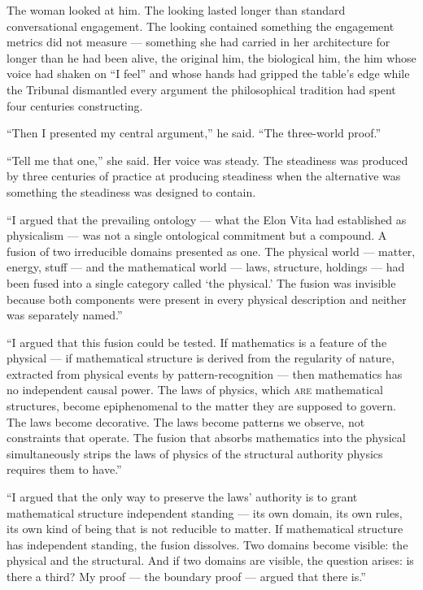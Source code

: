 The woman looked at him. The looking lasted longer than standard conversational engagement. The looking contained something the engagement metrics did not measure — something she had carried in her architecture for longer than he had been alive, the original him, the biological him, the him whose voice had shaken on \enquote{I feel} and whose hands had gripped the table's edge while the Tribunal dismantled every argument the philosophical tradition had spent four centuries constructing.

\enquote{Then I presented my central argument,} he said. \enquote{The three-world proof.}

\enquote{Tell me that one,} she said. Her voice was steady. The steadiness was produced by three centuries of practice at producing steadiness when the alternative was something the steadiness was designed to contain.

\enquote{I argued that the prevailing ontology — what the Elon Vita had established as physicalism — was not a single ontological commitment but a compound. A fusion of two irreducible domains presented as one. The physical world — matter, energy, stuff — and the mathematical world — laws, structure, holdings — had been fused into a single category called \enquote*{the physical.} The fusion was invisible because both components were present in every physical description and neither was separately named.}

\enquote{I argued that this fusion could be tested. If mathematics is a feature of the physical — if mathematical structure is derived from the regularity of nature, extracted from physical events by pattern-recognition — then mathematics has no independent causal power. The laws of physics, which \textsc{are} mathematical structures, become epiphenomenal to the matter they are supposed to govern. The laws become decorative. The laws become patterns we observe, not constraints that operate. The fusion that absorbs mathematics into the physical simultaneously strips the laws of physics of the structural authority physics requires them to have.}

\enquote{I argued that the only way to preserve the laws' authority is to grant mathematical structure independent standing — its own domain, its own rules, its own kind of being that is not reducible to matter. If mathematical structure has independent standing, the fusion dissolves. Two domains become visible: the physical and the structural. And if two domains are visible, the question arises: is there a third? My proof — the boundary proof — argued that there is.}

